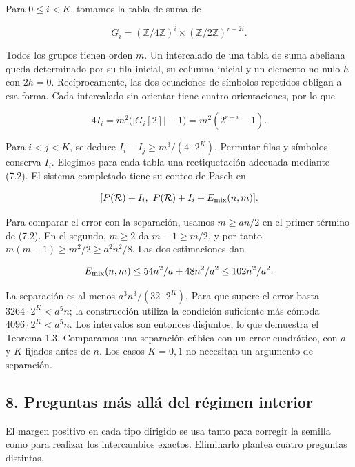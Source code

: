 \documentclass[spanish,11pt,a4paper]{article}
\begin{document}
Para \(0\le i<K\), tomamos la tabla de suma de

\[G_i=(\mathbb Z/4\mathbb Z)^i\times(\mathbb Z/2\mathbb Z)^{r-2i}.\]

Todos los grupos tienen orden \(m\). Un intercalado de una tabla de suma abeliana queda determinado por su fila inicial, su columna inicial y un elemento no nulo \(h\) con \(2h=0\). Recíprocamente, las dos ecuaciones de símbolos repetidos obligan a esa forma. Cada intercalado sin orientar tiene cuatro orientaciones, por lo que

\[4I_i=m^2\bigl(|G_i[2]|-1\bigr)=m^2(2^{r-i}-1).\tag{7.3}\]

Para \(i<j<K\), se deduce \(I_i-I_j\ge m^3/(4\cdot2^K)\). Permutar filas y símbolos conserva \(I_i\). Elegimos para cada tabla una reetiquetación adecuada mediante (7.2). El sistema completado tiene su conteo de Pasch en

\[[P(\mathcal R)+I_i,\ P(\mathcal R)+I_i+E_{\rm mix}(n,m)].\]

Para comparar el error con la separación, usamos \(m\ge an/2\) en el primer término de (7.2). En el segundo, \(m\ge2\) da \(m-1\ge m/2\), y por tanto \(m(m-1)\ge m^2/2\ge a^2n^2/8\). Las dos estimaciones dan

\[E_{\rm mix}(n,m)\le54n^2/a+48n^2/a^2\le102n^2/a^2.\]

La separación es al menos \(a^3n^3/(32\cdot2^K)\). Para que supere el error basta \(3264\cdot2^K<a^5n\); la construcción utiliza la condición suficiente más cómoda \(4096\cdot2^K<a^5n\). Los intervalos son entonces disjuntos, lo que demuestra el Teorema 1.3. Comparamos una separación cúbica con un error cuadrático, con \(a\) y \(K\) fijados antes de \(n\). Los casos \(K=0,1\) no necesitan un argumento de separación.

\subsection{8. Preguntas más allá del régimen interior}\label{preguntas-muxe1s-alluxe1-del-ruxe9gimen-interior}

El margen positivo en cada tipo dirigido se usa tanto para corregir la semilla como para realizar los intercambios exactos. Eliminarlo plantea cuatro preguntas distintas.
\end{document}
